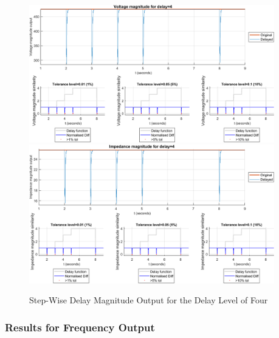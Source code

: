 \begin{figure}
    \caption{Step-Wise Delay Magnitude Output for the Delay Level of Four}
    \includegraphics[width=0.95\textwidth]{PMUsim-figures/DelayOf_4/Step_vMagnitude.png}    
      \includegraphics[width=0.95\textwidth]{PMUsim-figures/DelayOf_4/Step_iMagnitude.png}      
    \label{fig:PMUsimStep_Four_Magnitude}
    \begin{small}
     \end{small}

\end{figure}

\newpage \subsubsection{Results for Frequency Output}


